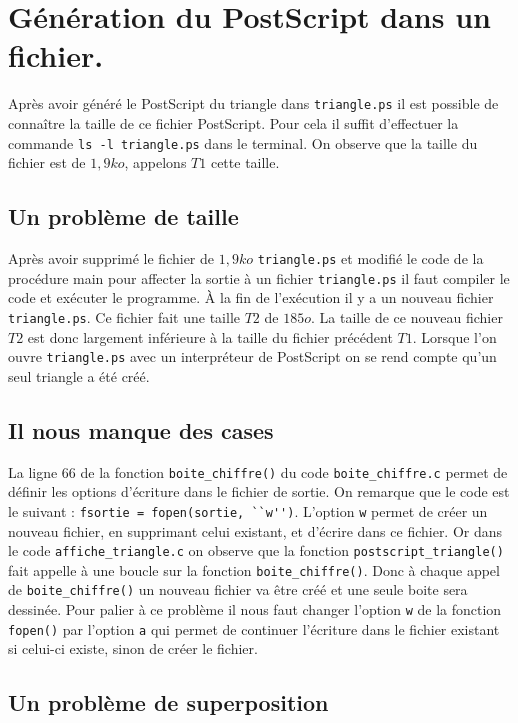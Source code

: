 \section{Génération du PostScript dans un fichier.}

Après avoir généré le PostScript du triangle dans \verb!triangle.ps! il est possible de connaître la taille de ce fichier PostScript. 
Pour cela il suffit d'effectuer la commande \verb!ls -l triangle.ps! dans le terminal.
On observe que la taille du fichier est de $1,9ko$, appelons $T1$ cette taille.

\subsection{Un problème de taille}

Après avoir supprimé le fichier de $1,9ko$ \verb!triangle.ps! et modifié le code de la procédure main pour affecter la sortie à un fichier \verb!triangle.ps! il faut compiler le code et exécuter le programme.
À la fin de l'exécution il y a un nouveau fichier \verb!triangle.ps!.
Ce fichier fait une taille $T2$ de $185o$. 
La taille de ce nouveau fichier $T2$ est donc largement inférieure à la taille du fichier précédent $T1$.
Lorsque l'on ouvre \verb!triangle.ps! avec un interpréteur de PostScript on se rend compte qu'un seul triangle a été créé.

\subsection{Il nous manque des cases}
\label{sub:cases}

La ligne $66$ de la fonction \verb!boite_chiffre()! du code \verb!boite_chiffre.c! permet de définir les options d'écriture dans le fichier de sortie.
On remarque que le code est le suivant : \verb!fsortie = fopen(sortie, ``w'')!.
L'option \verb!w! permet de créer un nouveau fichier, en supprimant celui existant, et d'écrire dans ce fichier.
Or dans le code \verb!affiche_triangle.c! on observe que la fonction \verb!postscript_triangle()! fait appelle à une boucle sur la fonction \verb!boite_chiffre()!.
Donc à chaque appel de \verb!boite_chiffre()! un nouveau fichier va être créé et une seule boite sera dessinée.
Pour palier à ce problème il nous faut changer l'option \verb!w! de la fonction \verb!fopen()! par l'option \verb!a! qui permet de continuer l'écriture dans le fichier existant si celui-ci existe, sinon de créer le fichier.

\subsection{Un problème de superposition}

